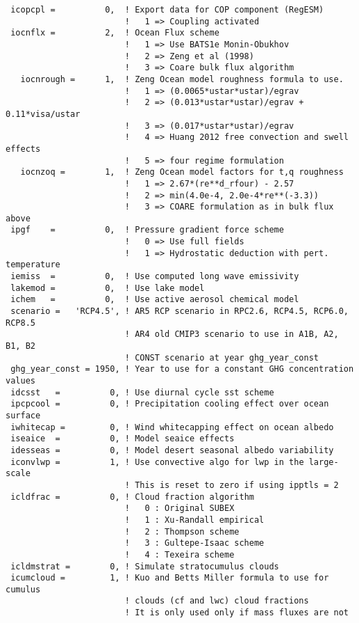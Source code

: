 {\begin{Verbatim}
 icopcpl =          0,  ! Export data for COP component (RegESM)
                        !   1 => Coupling activated
 iocnflx =          2,  ! Ocean Flux scheme
                        !   1 => Use BATS1e Monin-Obukhov
                        !   2 => Zeng et al (1998)
                        !   3 => Coare bulk flux algorithm
   iocnrough =      1,  ! Zeng Ocean model roughness formula to use.
                        !   1 => (0.0065*ustar*ustar)/egrav
                        !   2 => (0.013*ustar*ustar)/egrav + 0.11*visa/ustar
                        !   3 => (0.017*ustar*ustar)/egrav
                        !   4 => Huang 2012 free convection and swell effects
                        !   5 => four regime formulation
   iocnzoq =        1,  ! Zeng Ocean model factors for t,q roughness
                        !   1 => 2.67*(re**d_rfour) - 2.57
                        !   2 => min(4.0e-4, 2.0e-4*re**(-3.3))
                        !   3 => COARE formulation as in bulk flux above
 ipgf    =          0,  ! Pressure gradient force scheme
                        !   0 => Use full fields
                        !   1 => Hydrostatic deduction with pert. temperature
 iemiss  =          0,  ! Use computed long wave emissivity
 lakemod =          0,  ! Use lake model
 ichem   =          0,  ! Use active aerosol chemical model
 scenario =   'RCP4.5', ! AR5 RCP scenario in RPC2.6, RCP4.5, RCP6.0, RCP8.5
                        ! AR4 old CMIP3 scenario to use in A1B, A2, B1, B2
                        ! CONST scenario at year ghg_year_const
 ghg_year_const = 1950, ! Year to use for a constant GHG concentration values
 idcsst   =          0, ! Use diurnal cycle sst scheme
 ipcpcool =          0, ! Precipitation cooling effect over ocean surface
 iwhitecap =         0, ! Wind whitecapping effect on ocean albedo
 iseaice  =          0, ! Model seaice effects
 idesseas =          0, ! Model desert seasonal albedo variability
 iconvlwp =          1, ! Use convective algo for lwp in the large-scale
                        ! This is reset to zero if using ipptls = 2
 icldfrac =          0, ! Cloud fraction algorithm
                        !   0 : Original SUBEX
                        !   1 : Xu-Randall empirical
                        !   2 : Thompson scheme
                        !   3 : Gultepe-Isaac scheme
                        !   4 : Texeira scheme
 icldmstrat =        0, ! Simulate stratocumulus clouds
 icumcloud =         1, ! Kuo and Betts Miller formula to use for cumulus
                        ! clouds (cf and lwc) cloud fractions
                        ! It is only used only if mass fluxes are not

\end{Verbatim}}
